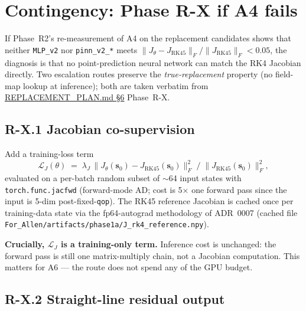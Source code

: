 \documentclass[11pt,a4paper]{article}
\newcommand{\state}{\ensuremath{\mathbf{s}}}
\newcommand{\J}{\ensuremath{J}}
\newcommand{\code}[1]{\texttt{#1}}
\begin{document}
\section{Contingency: Phase R-X if A4 fails}
\label{sec:contingency}

If Phase~R2's re-measurement of A4 on the replacement candidates shows
that neither \code{MLP\_v2} nor \code{pinn\_v2\_*} meets
$\|J_\theta - J_\text{RK45}\|_F / \|J_\text{RK45}\|_F < 0.05$, the
diagnosis is that no point-prediction neural network can match the RK4
Jacobian directly. Two escalation routes preserve the
\emph{true-replacement} property (no field-map lookup at inference); both
are taken verbatim from
\href{run:../../experiments/gen_3/REPLACEMENT_PLAN.md}{REPLACEMENT\_PLAN.md \S6}
Phase~R-X.

\subsection{R-X.1 Jacobian co-supervision}
\label{sec:rx1}

Add a training-loss term
\[
\mathcal{L}_\J(\theta) \;=\; \lambda_\J \,
\bigl\lVert J_\theta(\state_0) - J_\text{RK45}(\state_0) \bigr\rVert_F^2 \;/\;
\bigl\lVert J_\text{RK45}(\state_0) \bigr\rVert_F^2,
\]
evaluated on a per-batch random subset of $\sim$64 input states with
\code{torch.func.jacfwd} (forward-mode AD; cost is 5$\times$ one forward
pass since the input is 5-dim post-fixed-\code{qop}). The RK45 reference
Jacobian is cached once per training-data state via the fp64-autograd
methodology of ADR~0007 (cached file
\code{For\_Allen/artifacts/phase1a/J\_rk4\_reference.npy}).

\textbf{Crucially, \(\mathcal{L}_\J\) is a training-only term.} Inference
cost is unchanged: the forward pass is still one matrix-multiply chain,
not a Jacobian computation. This matters for A6 --- the route does not
spend any of the GPU budget.

\subsection{R-X.2 Straight-line residual output}
\label{sec:rx2}
\end{document}
